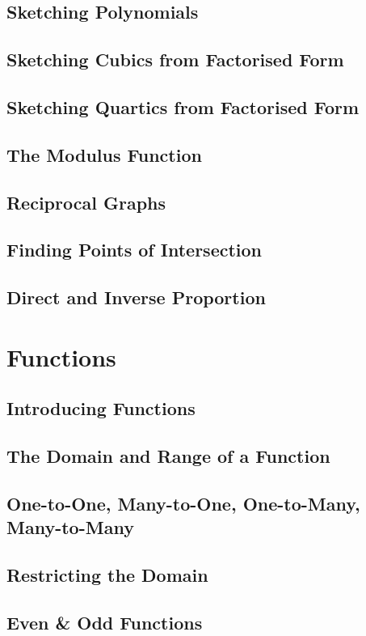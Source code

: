 \documentclass[../maths.tex]{subfiles}
\begin{document}
\subsection*{Sketching Polynomials}
\subsection*{Sketching Cubics from Factorised Form}
\subsection*{Sketching Quartics from Factorised Form}
\subsection*{The Modulus Function}
\subsection*{Reciprocal Graphs}
\subsection*{Finding Points of Intersection}
\subsection*{Direct and Inverse Proportion}
\section{Functions}
\subsection*{Introducing Functions}
\subsection*{The Domain and Range of a Function}
\subsection*{One-to-One, Many-to-One, One-to-Many, Many-to-Many}
\subsection*{Restricting the Domain}
\subsection*{Even \& Odd Functions}
\end{document}

